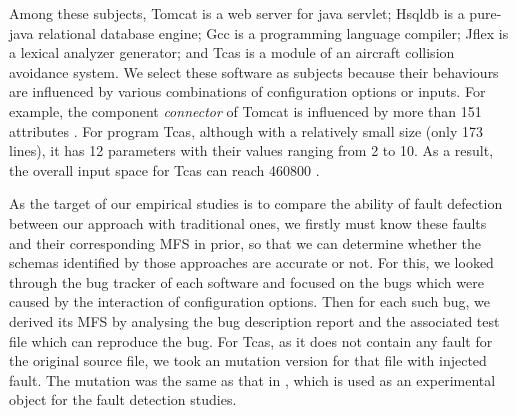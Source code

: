 \documentclass[10pt,journal,compsoc]{IEEEtran}
\begin{document}
Among these subjects, Tomcat is a web server for java servlet; Hsqldb is a pure-java relational database engine; Gcc is a programming language compiler; Jflex is a lexical analyzer generator; and Tcas is a module of an aircraft collision avoidance system. We select these software as subjects because their behaviours are influenced by various combinations of configuration options or inputs. For example, the component \emph{connector} of Tomcat is influenced by more than 151 attributes \cite{tomcatconnector}. For program Tcas, although with a relatively small size (only 173 lines), it has 12 parameters with their values ranging from 2 to 10. As a result, the overall input space for Tcas can reach 460800 \cite{shakya2012isolating,kuhn2006pseudo}.


As the target of our empirical studies is to compare the ability of fault defection between our approach with traditional ones, we firstly must know these faults and their corresponding MFS in prior, so that we can determine whether the schemas identified by those approaches are accurate or not.  For this, we looked through the bug tracker of each software and focused on the bugs which were caused by the interaction of configuration options. Then for each such bug, we derived its MFS by analysing the bug description report and the associated test file which can reproduce the bug. For Tcas, as it does not contain any fault for the original source file, we took an mutation version for that file with injected fault. The mutation was the same as that in \cite{kuhn2006pseudo}, which is used as an experimental object for the fault detection studies.

%
%
%
%
\end{document}
